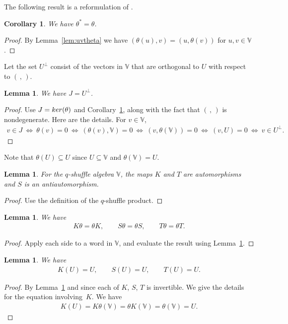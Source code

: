 \documentclass[11pt]{article}
\numberwithin{equation}{section}
\numberwithin{equation}{section}
\newtheorem{Corollary}[Theorem]{Corollary}
\newtheorem{Lemma}[Theorem]{Lemma}
\begin{document}
{The following result is a reformulation of \cite[Theorem~4.5]{green}.
\begin{Corollary}\label{cor:sdtheta}
We have $\theta^*=\theta$.
\end{Corollary}
\begin{proof} By Lemma~\ref{lem:uvtheta} we have $(\theta(u),v)= (u, \theta(v))$ for $u,v \in \mathbb V$.
\end{proof}

Let the set $U^\perp$ consist of the vectors in $\mathbb V$ that are orthogonal to $U$ with respect to
 $(\,,\,)$.
\begin{Lemma}\label{lem:ds}We have $J=U^\perp$.
\end{Lemma}
\begin{proof} Use $J={\rm ker}(\theta)$ and
Corollary~\ref{cor:sdtheta}, along with the fact that $(\,,\,)$ is nondegenerate.
Here are the details. For $v \in \mathbb V$,
\begin{gather*}
v \in J \ \Leftrightarrow\
\theta(v)=0 \ \Leftrightarrow \
( \theta(v),\mathbb V)=0\ \Leftrightarrow \
(v, \theta(\mathbb V))=0 \ \Leftrightarrow\
(v,U)=0 \ \Leftrightarrow \ v \in U^\perp.\tag*{\qed}
\end{gather*}\renewcommand{\qed}{}
\end{proof}

Note that $\theta(U)\subseteq U$ since $U \subseteq \mathbb V$ and $\theta(\mathbb V)=U$.

\begin{Lemma}\label{lem:thetaKTS}For the $q$-shuffle algebra $\mathbb V$, the maps $K$ and $T$
are automorphisms and $S$ is an antiautomorphism.
\end{Lemma}
\begin{proof}Use the definition of the $q$-shuffle product.
\end{proof}

\begin{Lemma}\label{lem:thetaKTS2}We have
\begin{gather*}
K \theta = \theta K, \qquad
S \theta = \theta S, \qquad
T \theta = \theta T.
\end{gather*}
\end{Lemma}
\begin{proof} Apply each side to a word in $\mathbb V$, and evaluate the result using Lemma~\ref{lem:thetaKTS}.
\end{proof}

\begin{Lemma}\label{lem:KSTU}We have
\begin{gather*}
 K (U) = U, \qquad S (U) = U, \qquad T (U) = U.
\end{gather*}
\end{Lemma}
\begin{proof} By Lemma~\ref{lem:thetaKTS2} and since each of $K$, $S$, $T$ is invertible. We give the details for the equation involving~$K$. We have
\begin{gather*}
K(U) = K \theta (\mathbb V) = \theta K(\mathbb V) = \theta(\mathbb V) = U.\tag*{\qed}
\end{gather*}\renewcommand{\qed}{}
\end{proof}

}
\end{document}
